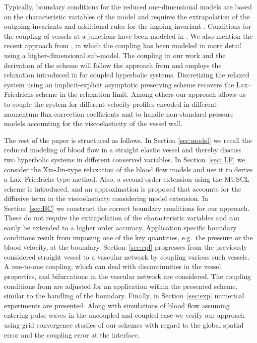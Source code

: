 \documentclass[a4paper,11pt]{article}
\begin{document}
Typically, boundary conditions for the reduced one-dimensional models are based on the characteristic variables of the model and requires the extrapolation of the outgoing invariants and additional rules for the ingoing invariant \cite{formaggia2006,peiro2009reduc}. Conditions for the coupling of vessels at a junctions have been modeled in \cite{formaggia2003}. We also mention the recent approach from \cite{lucca2023}, in which the coupling has been modeled in more detail using a higher-dimensional sub-model. The coupling in our work and the derivation of the scheme will follow the approach from  \cite{herty2023centrschemtwo,herty2023centr} and employs the relaxation introduced in \cite{jin1995relaxschemsystem} for coupled hyperbolic systems. Discretizing the relaxed system using an implicit-explicit asymptotic preserving scheme recovers the Lax--Friedrichs scheme in the relaxation limit. Among others our approach allows us to couple the system for different velocity profiles encoded in different momentum-flux correction coefficients and to handle non-standard pressure models accounting for the viscoelasticity of the vessel wall.

The rest of the paper is structured as follows. In Section \ref{sec:model} we recall the reduced modeling of blood flow in a straight elastic vessel and thereby discuss two hyperbolic systems in different conserved variables. In Section~\ref{sec: LF} we consider the Xin-Jin-type relaxation of the blood flow models and use it to derive a Lax--Friedrichs type method. Also, a second-order extension using the MUSCL scheme is introduced, and an approximation is proposed that accounts for the diffusive term in the viscoelasticity considering model extension. 
In Section~\ref{sec:BC} we construct the correct boundary conditions for our approach. These do not require the extrapolation of the characteristic variables and can easily be extended to a higher order accuracy. Application specific boundary conditions result from imposing one of the key quantities, e.g.\ the pressure or the blood velocity, at the boundary.
Section~\ref{sec:cpl} progresses from the previously considered straight vessel to a vascular network by coupling various such vessels. A one-to-one coupling, which can deal with discontinuities in the vessel properties, and bifurcations in the vascular network are considered. The coupling conditions from \cite{formaggia2003} are adjusted for an application within the presented scheme, similar to the handling of the boundary.
Finally, in Section~\ref{sec:exp} numerical experiments are presented. Along with simulations of blood flow assuming entering pulse waves in the uncoupled and coupled case we verify our approach using grid convergence studies of our schemes with regard to the global spatial error and the coupling error at the interface.
\end{document}
